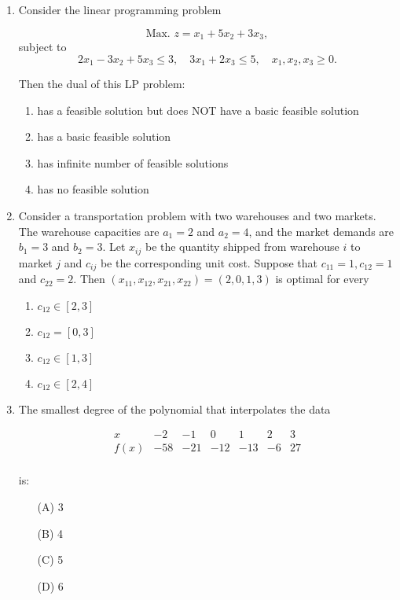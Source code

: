 \documentclass[journal]{IEEEtran}
\numberwithin{figure}{enumi}
\begin{document}
\begin{enumerate}
\item Consider the linear programming problem

\begin{equation*}
\text{Max. } z = x_1 + 5x_2 + 3x_3,
\end{equation*}
subject to
\begin{equation*}
2x_1 - 3x_2 + 5x_3 \leq 3, \quad 3x_1 + 2x_3 \leq 5, \quad x_1, x_2, x_3 \geq 0.
\end{equation*}

Then the dual of this LP problem:

\begin{enumerate}
    \item has a feasible solution but does NOT have a basic feasible solution
    \item has a basic feasible solution
    \item has infinite number of feasible solutions
    \item has no feasible solution
\end{enumerate}

\item Consider a transportation problem with two warehouses and two markets. The warehouse capacities are $a_1 = 2$ and $a_2 = 4$, and the market demands are $b_1 = 3$ and $b_2 = 3$. Let $x_{ij}$ be the quantity shipped from warehouse $i$ to market $j$ and $c_{ij}$ be the corresponding unit cost. Suppose that $c_{11} = 1, c_{12} = 1$ and $c_{22} = 2$. Then $(x_{11}, x_{12}, x_{21}, x_{22}) = (2, 0, 1, 3)$ is optimal for every

\begin{enumerate}
    \item $c_{12} \in [2, 3]$
    \item $c_{12} = [0, 3]$
    \item $c_{12} \in [1, 3]$
    \item $c_{12} \in [2, 4]$
\end{enumerate}
\item The smallest degree of the polynomial that interpolates the data

\[
\begin{array}{c|cccccc}
x & -2 & -1 & 0 & 1 & 2 & 3 \\
\hline
f(x) & -58 & -21 & -12 & -13 & -6 & 27 \\
\end{array}
\]

is:

\begin{enumerate}
    \item[(A)] 3
    \item[(B)] 4
    \item[(C)] 5
    \item[(D)] 6
\end{enumerate}


\end{enumerate}
\end{document}
